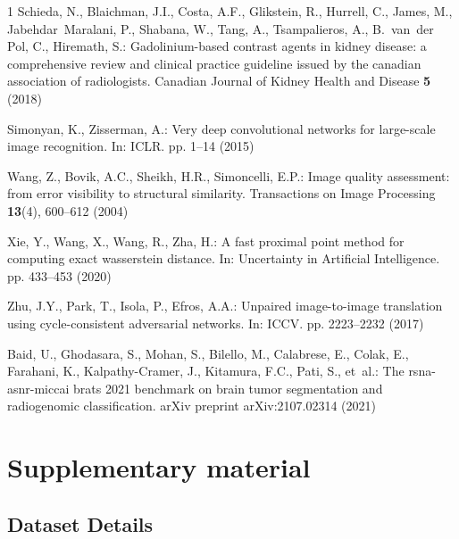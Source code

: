 \documentclass[a4paper,10pt]{article}
\begin{document}
\begin{thebibliography}{1}
Schieda, N., Blaichman, J.I., Costa, A.F., Glikstein, R., Hurrell, C., James,
  M., Jabehdar~Maralani, P., Shabana, W., Tang, A., Tsampalieros, A.,
  B.~van~der Pol, C., Hiremath, S.: Gadolinium-based contrast agents in kidney
  disease: a comprehensive review and clinical practice guideline issued by the
  canadian association of radiologists. Canadian Journal of Kidney Health and
  Disease  \textbf{5} (2018)

Simonyan, K., Zisserman, A.: Very deep convolutional networks for large-scale
  image recognition. In: ICLR. pp. 1--14 (2015)

Wang, Z., Bovik, A.C., Sheikh, H.R., Simoncelli, E.P.: Image quality
  assessment: from error visibility to structural similarity. Transactions on
  Image Processing  \textbf{13}(4),  600--612 (2004)

Xie, Y., Wang, X., Wang, R., Zha, H.: A fast proximal point method for
  computing exact wasserstein distance. In: Uncertainty in Artificial
  Intelligence. pp. 433--453 (2020)

Zhu, J.Y., Park, T., Isola, P., Efros, A.A.: Unpaired image-to-image
  translation using cycle-consistent adversarial networks. In: ICCV. pp.
  2223--2232 (2017)

Baid, U., Ghodasara, S., Mohan, S., Bilello, M., Calabrese, E., Colak, E.,
  Farahani, K., Kalpathy-Cramer, J., Kitamura, F.C., Pati, S., et~al.: The
  rsna-asnr-miccai brats 2021 benchmark on brain tumor segmentation and
  radiogenomic classification. arXiv preprint arXiv:2107.02314  (2021)

\end{thebibliography}

\pagebreak

\section*{Supplementary material}


\subsection*{Dataset Details}
\end{document}
